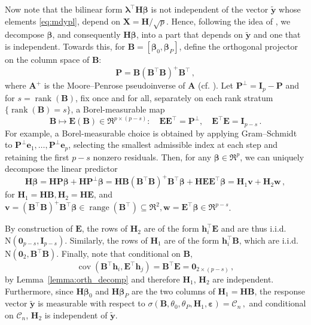 \documentclass{article}
\DeclareMathOperator{\cov}{cov}
\theoremstyle{definition}
\newcommand*{\bb}{\boldsymbol}
\def\bw {\bb{w}}
\def\bH {\bb{H}}
\def\bv{\bb{v}}
\def\bh{\bb{h}}
\def\bYtil{\widetilde{\bb{y}}}
\def\bA{\bb{A}}
\def\bB{\bb{B}}
\def\bbeta{\bb{\beta}}
\def\bH{\bb{H}}
\newcommand{\rank}{\operatorname{rank}}
\begin{document}
\begin{bibunit}
Now note that the bilinear form $\bb{\lambda}^\top \bb{H} \bbeta$ is not independent of the vector $\bYtil$ whose elements \eqref{eq:mdypl},
depend on $\bb X = \bb{H} / \sqrt{p}$. Hence, following the idea of \citet{salehi+et+al:2019}, we decompose $\bbeta$, and consequently $\bH\bbeta$, into a part that depends on $\bYtil$ and one that is independent.
Towards this, for $ \bB = [\bbeta_0, \bbeta_P]$, define the orthogonal projector on the column space of $\bB$:
\begin{equation}
	\label{eq:b-proj}
	 \bb{P} = \bb{B}  \left(\bb{B}^\top \bb{B} \right)^{+} \bb{B}^\top \,,
\end{equation}
where $\bA^{+}$ is the Moore--Penrose pseudoinverse of $\bA$ (cf. \citealt[Chapter~2]{magnus+neudecker:2019}). Let $\bb{P}^\perp = \bb{I}_p - \bb{P}$ 
and for $s=\rank(\bb B)$, fix once and for all, separately on each
rank stratum $\{\rank(\bb B)=s\}$, a Borel-measurable map
$$
	\bb B
	\mapsto
	\bb E(\bb B)\in\Re^{p\times(p-s)}: \quad 
	\bb E\bb E^\top=\bb P^\perp,
	\quad
	\bb E^\top\bb E=\bb I_{p-s}\,.
$$
For example, a Borel-measurable choice is obtained by applying 
Gram--Schmidt to $\bb P^\perp\bb e_1,\ldots,\bb P^\perp\bb e_p$,
selecting the smallest admissible index at each step and retaining the
first $p-s$ nonzero residuals.
Then, for any $\bbeta \in \Re^p$, we can uniquely decompose the linear predictor
\begin{equation}
\label{eq:H_beta}
    \bb{H} \bbeta = \bb{H} \bb{P} \bbeta +\bb{H}  \bb{P}^\perp  \bbeta = \bb{H}\bB (\bB^\top \bB)^{+} \bB^\top \bbeta  + \bb{H} \bb{E}\bb{E}^\top \bbeta = \bb{H}_1 \bv + \bb{H}_2 \bw \,,
\end{equation}
for $\bb{H}_1 = \bb H \bB, \bb H_2 = \bb H \bb E$, and $\bv =  \left(\bb{B}^\top \bb{B} \right)^{+} \bb{B}^\top  \bbeta \in \operatorname{range}(\bb B^\top) \subseteq \Re^2, \bw = \bb E^\top \bbeta \in \Re^{p-s}$.

By construction of $\bb E$, the rows of $\bH_2$ are of the form $\bb h_i^\top \bb E $ and are thus i.i.d. $\mathrm{N}(\bb 0_{p - s}, \bb I_{p - s})$. Similarly, the rows of $\bH_1$ are of the form
$\bb h_i^\top \bB$, which are i.i.d. $\mathrm{N}(\bb{0}_2, \bB^\top \bB)$. Finally, note that conditional on $\bb B$,
$$
	\cov \left(\bb B^\top \bh_i, \bb E^\top \bh_j\right) = \bb B^\top \bb E = \bb{0}_{2 \times (p - s)} \,,
$$
by Lemma~\ref{lemma:orth_decomp} and therefore $\bb H_1$, $\bb H_2$ are independent.
Furthermore, since $\bH\bbeta_0$ and $\bH\bbeta_P$ are the two columns of $\bH_1=\bH \bb B$,
the response vector $\bYtil$ is measurable with respect to $\sigma(\bb B,\theta_0,\theta_P,\bH_1,\bb \varepsilon)=\mathcal C_n \,,$
and conditional on $\mathcal{C}_n$, $\bH_2$ is independent of $\bYtil$.


\end{bibunit}
\end{document}
